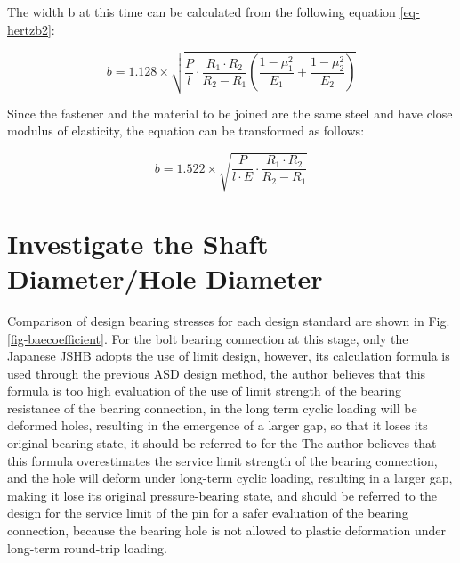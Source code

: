 The width b at this time can be calculated from the following equation \ref{eq-hertzb2}: \par

\begin{equation}
    b=1.128 \times \sqrt{\dfrac{P}{l} \cdot \frac{R_{1} \cdot R_{2}}{R_{2}-R_{1}}\left(\dfrac{1-\mu_{1}^{2}}{E_{1}}+\dfrac{1-\mu_{2}^{2}}{E_{2}}\right)}
    \label{eq-hertzb2}
\end{equation}

Since the fastener and the material to be joined are the same steel and have close modulus of elasticity, the equation can be transformed as follows:

\begin{equation}
    b=1.522 \times \sqrt{\dfrac{P}{l \cdot E} \cdot \dfrac{R_{1} \cdot R_{2}}{R_{2}-R_{1}}}
    \label{eq-hertzb3}
\end{equation}



\section{Investigate the Shaft Diameter/Hole Diameter}

Comparison of design bearing stresses for each design standard are shown in Fig. \ref{fig-baecoefficient}.
For the bolt bearing connection at this stage, only the Japanese \ac{JSHB} adopts the use of limit design, however, its calculation formula is used through the previous \ac{ASD} design method, the author believes that this formula is too high evaluation of the use of limit strength of the bearing resistance of the bearing connection, in the long term cyclic loading will be deformed holes, resulting in the emergence of a larger gap, so that it loses its original bearing state, it should be referred to for the The author believes that this formula overestimates the service limit strength of the bearing connection, and the hole will deform under long-term cyclic loading, resulting in a larger gap, making it lose its original pressure-bearing state, and should be referred to the design for the service limit of the pin for a safer evaluation of the bearing connection, because the bearing hole is not allowed to plastic deformation under long-term round-trip loading.

